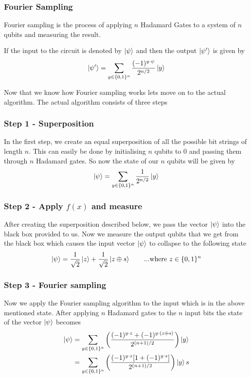 \documentclass[13pt]{article}
\begin{document}
\subsubsection*{Fourier Sampling}
Fourier sampling is the process of applying $n$ Hadamard Gates to a system of $n$ qubits and measuring the result.

If the input to the circuit is denoted by $\ket{\psi}$ and then the output $\ket{\psi'}$ is given by
$$\ket{\psi'} = \sum_{y \in \{0, 1\}^n}\frac{(-1)^{y\cdot\psi}}{2^{n/2}}\ket{y}$$

Now that we know how Fourier sampling works lets move on to the actual algorithm. The actual algorithm consists of three steps

\subsubsection{Step 1 - Superposition}
In the first step, we create an equal superposition of all the possible bit strings of length $n$. This can easily be done by initialising $n$ qubits to $0$ and  passing them through $n$ Hadamard gates. So now the state of our $n$ qubits will be given by
$$ \ket{\psi} = \sum_{y \in \{0, 1\}^n}\frac{1}{2^{n/2}}\ket{y}$$

\subsubsection{Step 2 - Apply $f(x)$ and measure}
After creating the superposition described below, we pass the vector $\ket{\psi}$ into the black box provided to us. Now we measure the output qubits that we get from the black box which causes the input vector $\ket{\psi}$ to collapse to the following state
$$ \ket{\psi} = \frac{1}{\sqrt{2}}\ket{z} + \frac{1}{\sqrt{2}}\ket{z \oplus s} \qquad \text{...where} \ z \in \{0, 1\}^n$$

\subsubsection{Step 3 - Fourier sampling}
Now we apply the Fourier sampling algorithm to the input which is in the above mentioned state. After applying $n$ Hadamard gates to the $n$ input bits the state of the vector $\ket{\psi}$ becomes
\begin{align*}
    \ket{\psi} &= \sum_{y \in \{0, 1\}^n}\left(\frac{(-1)^{y\cdot z} + (-1)^{y\cdot(z \oplus s)}}{2^{(n+1)/2}}\right)\ket{y} \\
    &= \sum_{y \in \{0, 1\}^n}\left(\frac{(-1)^{y\cdot z}[1 + (-1)^{y\cdot s}]}{2^{(n+1)/2}}\right)\ket{y}s
\end{align*}
\end{document}
